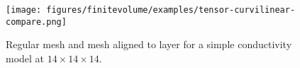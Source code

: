 \begin{figure}[ht]
\begin{center}
\texttt{[image: figures/finitevolume/examples/tensor-curvilinear-compare.png]}
\end{center}
\caption{Regular mesh and mesh aligned to layer for a simple conductivity model at $14\times14\times14$.}
\label{fig:fv-ex-tensor-curvilinear-compare}
\end{figure}
